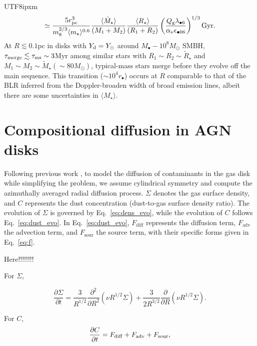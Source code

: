 \documentclass[linenumbers,trackchanges]{aastex701}
\begin{document}
\begin{CJK*}{UTF8}{ipxm}
\begin{equation}
    \simeq {5  r_{\rm pc} ^3  \over 
    m_8^{2/3}\langle m_\star \rangle ^{0.6}}
    {\langle \tilde M_\star \rangle 
    \over  (M_1+M_2) } 
    {\langle R_\star \rangle 
    \over (R_1 + R_2)}
    \left( {Q_{\rm g}  \lambda_{\bullet 6} \over 
    \alpha_\nu \epsilon_{\bullet 06}} \right)^{1/3}
    {\rm Gyr} .
\end{equation}
At $R \lesssim 0.1$pc in disks with $Y_{\rm d}= Y_\odot$ around $M_\bullet-10^8 M_\odot$ SMBH, 
$\tau_{\rm merge} \lesssim \tau_{\rm ms} \sim 3$Myr
among similar stars with $R_1\sim R_2 \sim {\tilde R}
_\star$ and $M_1\sim M_2 \sim {\tilde M}_\star
(\sim 80 M_\odot)$, typical-mass stars merge before 
they evolve off the main sequence.  This transition 
($\sim 10^4 r_\bullet$) occurs at $R$ comparable to 
that of the BLR inferred from the Doppler-broaden
width of broad emission lines, albeit there are some
uncertainties in $\langle M_\star \rangle$.

\section{Compositional diffusion in AGN disks}
\label{sec:diffusion}

Following previous work \citep{zhou2022}, to model the diffusion of contaminants in the gas disk while simplifying the problem, we assume cylindrical symmetry and compute the azimuthally averaged radial diffusion process. $\Sigma$ denotes the gas surface density, and $C$ represents the dust concentration (dust-to-gas surface density ratio). The evolution of $\Sigma$ is governed by Eq.~\ref{eq:dens_evo}, while the evolution of $C$ follows Eq.~\ref{eq:dust_evo}. In Eq.~\ref{eq:dust_evo}, $F_{\mathrm{diff}}$ represents the diffusion term, $F_{\mathrm{adv}}$ the advection term, and $F_{\mathrm{sour}}$ the source term, with their specific forms given in Eq.~\ref{eq:f}. 


Here!!!!!!!!


For $\Sigma$,

\begin{equation}
     \frac{\partial \Sigma}{\partial t}=\frac{3}{R^{1/2}}\frac{\partial^2}{\partial R^2}(\nu R^{1/2}\Sigma)+\frac{3}{2R^{3/2}}\frac{\partial}{\partial R}(\nu R^{1/2}\Sigma).
\label{eq:dens_evo}
\end{equation}

For $C$, 
\begin{equation}
\frac{\partial C}{\partial t}=F_{\rm diff}+F_{\rm adv}+F_{\rm sour},
\label{eq:dust_evo}
\end{equation}


\end{CJK*}
\end{document}
